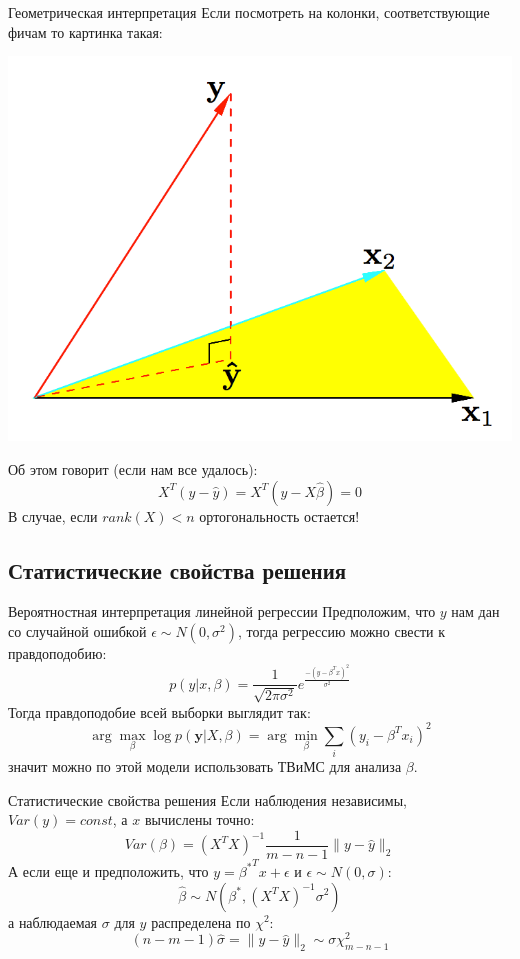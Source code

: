 \documentclass[14pt, fleqn, xcolor={dvipsnames, table}]{beamer}
\begin{document}
\begin{frame}{Геометрическая интерпретация}
\small
Если посмотреть на колонки, соответствующие фичам то картинка такая:
\begin{center}
\includegraphics[height=0.4\textheight]{3_2.png}
\end{center}
Об этом говорит (если нам все удалось):
$$
X^T(y - \hat{y}) = X^T(y - X\hat{\beta}) = 0
$$
В случае, если $rank(X) < n$ ортогональность остается!
\end{frame}

\subsection{Статистические свойства решения}

\begin{frame}{Вероятностная интерпретация линейной регрессии}
Предположим, что $y$ нам дан со случайной ошибкой $\epsilon \sim N(0, \sigma^2)$, тогда регрессию можно свести к правдоподобию:
$$
p(y|x, \beta) = \frac{1}{\sqrt{2\pi\sigma^2}} e^{\frac{-(y - \beta^T x)^2}{\sigma^2}}
$$
Тогда правдоподобие всей выборки выглядит так:
$$
\arg \max_\beta \log p(\mathbf{y}|X, \beta) = \arg \min_\beta \sum_i \left(y_i - \beta^Tx_i\right)^2
$$
значит можно по этой модели использовать ТВиМС для анализа $\beta$.
\end{frame}

\begin{frame}{Статистические свойства решения}
Если наблюдения независимы, $Var(y) = const$, а $x$ вычислены точно:
$$
Var(\beta) = \left(X^TX\right)^{-1}\frac{1}{m - n - 1}\|y - \hat{y}\|_2
$$
А если еще и предположить, что $y={\beta^*}^Tx + \epsilon$ и $\epsilon \sim N(0,\sigma)$:
$$
\hat{\beta} \sim N(\beta^*, \left(X^TX\right)^{-1}\sigma^2)
$$
а наблюдаемая $\sigma$ для $y$ распределена по $\chi^2$:
$$
(n-m-1)\hat{\sigma} = \|y - \hat{y}\|_2 \sim \sigma \chi^2_{m-n-1}
$$
\end{frame}
\end{document}

